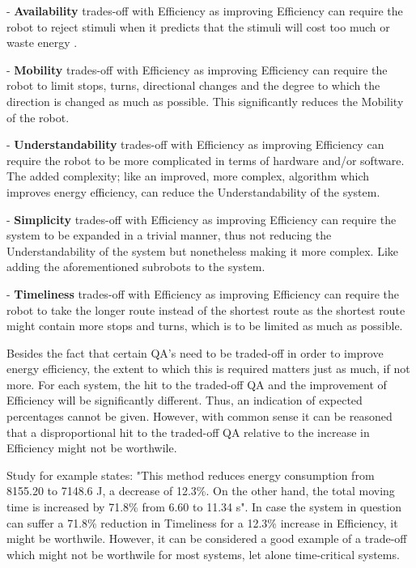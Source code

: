 - \textbf{Availability} trades-off with Efficiency as improving Efficiency can require the robot to reject stimuli when it predicts
that the stimuli will cost too much or waste energy \cite{kirtay2013humanoid_emotion}.

- \textbf{Mobility} trades-off with Efficiency as improving Efficiency can require the robot to limit stops, turns, directional changes and the degree 
to which the direction is changed as much as possible. This significantly reduces the Mobility of the robot.

- \textbf{Understandability} trades-off with Efficiency as improving Efficiency can require the robot to be more complicated in terms of hardware
and/or software. 
The added complexity; like an improved, more complex, algorithm which improves energy efficiency, can reduce the Understandability of the system.

- \textbf{Simplicity} trades-off with Efficiency as improving Efficiency can require the system to be expanded in a trivial manner, thus not
reducing the Understandability of the system but nonetheless making it more complex. Like adding the aforementioned subrobots to the system.

- \textbf{Timeliness} trades-off with Efficiency as improving Efficiency can require the robot to take the longer route instead of the shortest route
as the shortest route might contain more stops and turns, which is to be limited as much as possible.

\vspace{5mm}

Besides the fact that certain QA's need to be traded-off in order to improve energy efficiency, the extent to which this is required 
matters just as much, if not more.
For each system, the hit to the traded-off QA and the improvement of Efficiency will be significantly different.
Thus, an indication of expected percentages cannot be given.
However, with common sense it can be reasoned that a disproportional hit to the traded-off QA relative to the increase in Efficiency might not be worthwile.

Study \cite{kaitwanidvilai2020industrial_robot_cycle_time} for example states: "This method reduces energy consumption from 8155.20 to 7148.6 J, 
a decrease of 12.3\%.  On the other hand, the total moving time is increased by 71.8\% from 6.60 to 11.34 s". 
In case the system in question can suffer a 71.8\% reduction in Timeliness for a 12.3\% increase in Efficiency, it might be worthwile.
However, it can be considered a good example of a trade-off which might not be worthwile for most systems, let alone time-critical systems.

